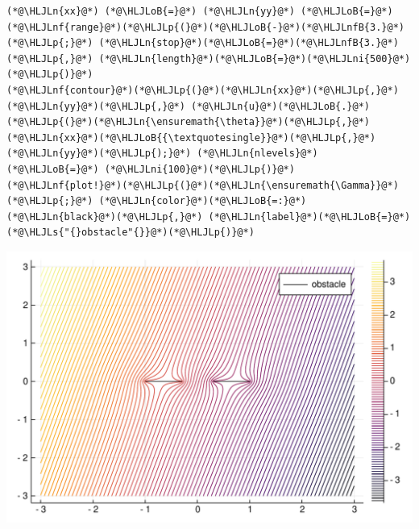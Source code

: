 \documentclass[12pt,a4paper]{article}
\newcommand{\HLJLn}[1]{#1}
\newcommand{\HLJLnf}[1]{\textcolor[RGB]{66,102,213}{#1}}
\newcommand{\HLJLs}[1]{\textcolor[RGB]{201,61,57}{#1}}
\newcommand{\HLJLnfB}[1]{\textcolor[RGB]{59,151,46}{#1}}
\newcommand{\HLJLni}[1]{\textcolor[RGB]{59,151,46}{#1}}
\newcommand{\HLJLoB}[1]{\textcolor[RGB]{102,102,102}{\textbf{#1}}}
\newcommand{\HLJLp}[1]{#1}
\begin{document}
\begin{lstlisting}
(*@\HLJLn{xx}@*) (*@\HLJLoB{=}@*) (*@\HLJLn{yy}@*) (*@\HLJLoB{=}@*) (*@\HLJLnf{range}@*)(*@\HLJLp{(}@*)(*@\HLJLoB{-}@*)(*@\HLJLnfB{3.}@*)(*@\HLJLp{;}@*) (*@\HLJLn{stop}@*)(*@\HLJLoB{=}@*)(*@\HLJLnfB{3.}@*)(*@\HLJLp{,}@*) (*@\HLJLn{length}@*)(*@\HLJLoB{=}@*)(*@\HLJLni{500}@*)(*@\HLJLp{)}@*)
(*@\HLJLnf{contour}@*)(*@\HLJLp{(}@*)(*@\HLJLn{xx}@*)(*@\HLJLp{,}@*) (*@\HLJLn{yy}@*)(*@\HLJLp{,}@*) (*@\HLJLn{u}@*)(*@\HLJLoB{.}@*)(*@\HLJLp{(}@*)(*@\HLJLn{\ensuremath{\theta}}@*)(*@\HLJLp{,}@*) (*@\HLJLn{xx}@*)(*@\HLJLoB{{\textquotesingle}}@*)(*@\HLJLp{,}@*)(*@\HLJLn{yy}@*)(*@\HLJLp{);}@*) (*@\HLJLn{nlevels}@*) (*@\HLJLoB{=}@*) (*@\HLJLni{100}@*)(*@\HLJLp{)}@*)
(*@\HLJLnf{plot!}@*)(*@\HLJLp{(}@*)(*@\HLJLn{\ensuremath{\Gamma}}@*)(*@\HLJLp{;}@*) (*@\HLJLn{color}@*)(*@\HLJLoB{=:}@*)(*@\HLJLn{black}@*)(*@\HLJLp{,}@*) (*@\HLJLn{label}@*)(*@\HLJLoB{=}@*)(*@\HLJLs{"{}obstacle"{}}@*)(*@\HLJLp{)}@*)
\end{lstlisting}

\includegraphics[width=\linewidth]{figures/Lecture15_3_1.pdf}
\end{document}
